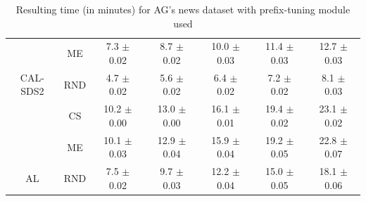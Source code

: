 \begin{table}[htbp]
\begin{tabular*}{\linewidth}{c|c|@{\extracolsep{\fill}}ccccc}
 & ME & 7.3 $\pm$ {\small 0.02} & 8.7 $\pm$ {\small 0.02} & 10.0 $\pm$ {\small 0.03} & 11.4 $\pm$ {\small 0.03} & 12.7 $\pm$ {\small 0.03}\\

\multirow{-3}{*}{\raggedright\arraybackslash CAL-SDS2} & RND & 4.7 $\pm$ {\small 0.02} & 5.6 $\pm$ {\small 0.02} & 6.4 $\pm$ {\small 0.02} & 7.2 $\pm$ {\small 0.02} & 8.1 $\pm$ {\small 0.03}\\
\midrule
 & CS & 10.2 $\pm$ {\small 0.00} & 13.0 $\pm$ {\small 0.00} & 16.1 $\pm$ {\small 0.01} & 19.4 $\pm$ {\small 0.02} & 23.1 $\pm$ {\small 0.02}\\

 & ME & 10.1 $\pm$ {\small 0.03} & 12.9 $\pm$ {\small 0.04} & 15.9 $\pm$ {\small 0.04} & 19.2 $\pm$ {\small 0.05} & 22.8 $\pm$ {\small 0.07}\\

\multirow{-3}{*}{\raggedright\arraybackslash AL} & RND & 7.5 $\pm$ {\small 0.02} & 9.7 $\pm$ {\small 0.03} & 12.2 $\pm$ {\small 0.04} & 15.0 $\pm$ {\small 0.05} & 18.1 $\pm$ {\small 0.06}\\
\bottomrule
\end{tabular*}
\caption{Resulting time (in minutes) for AG's news dataset with prefix-tuning module used}
\label{tab:time_full_agnews_10_prefix}
\end{table}

